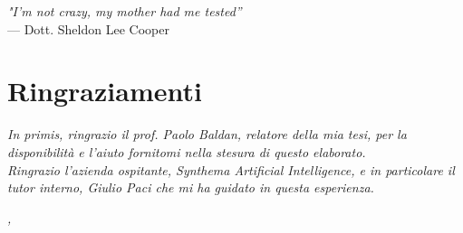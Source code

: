 
\cleardoublepage
{}
{}

\begin{flushright}{
    \slshape
    "I'm not crazy, my mother had me tested''} \\
  \medskip
  --- Dott. Sheldon Lee Cooper
\end{flushright}


\bigskip

\begingroup
\let\clearpage\relax
\let\cleardoublepage\relax
\let\cleardoublepage\relax

\chapter*{Ringraziamenti}

\noindent \textit{In primis, ringrazio il prof. Paolo Baldan, relatore della mia tesi, per la disponibilità e l'aiuto fornitomi nella stesura di questo elaborato.}\\

\noindent \textit{Ringrazio l'azienda ospitante, Synthema Artificial Intelligence, e in particolare il tutor interno, Giulio Paci che mi ha guidato in questa esperienza.}\\

\bigskip

\noindent\textit{\myLocation, \myTime}
\hfill \myName

\endgroup

